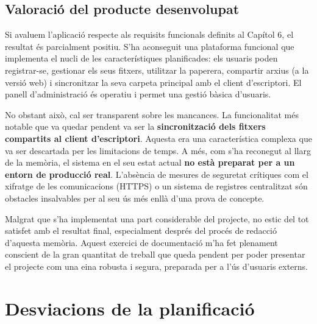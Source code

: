 \subsection{Valoració del producte desenvolupat}

Si avaluem l'aplicació respecte als requisits funcionals definits al Capítol 6, el resultat és parcialment positiu. S'ha aconseguit una plataforma funcional que implementa el nucli de les característiques planificades: els usuaris poden registrar-se, gestionar els seus fitxers, utilitzar la paperera, compartir arxius (a la versió web) i sincronitzar la seva carpeta principal amb el client d'escriptori. El panell d'administració és operatiu i permet una gestió bàsica d'usuaris.

No obstant això, cal ser transparent sobre les mancances. La funcionalitat més notable que va quedar pendent va ser la \textbf{sincronització dels fitxers compartits al client d'escriptori}. Aquesta era una característica complexa que va ser descartada per les limitacions de temps. A més, com s'ha reconegut al llarg de la memòria, el sistema en el seu estat actual \textbf{no està preparat per a un entorn de producció real}. L'absència de mesures de seguretat crítiques com el xifratge de les comunicacions (HTTPS) o un sistema de registres centralitzat són obstacles insalvables per al seu ús més enllà d'una prova de concepte.

Malgrat que s'ha implementat una part considerable del projecte, no estic del tot satisfet amb el resultat final, especialment després del procés de redacció d'aquesta memòria. Aquest exercici de documentació m'ha fet plenament conscient de la gran quantitat de treball que queda pendent per poder presentar el projecte com una eina robusta i segura, preparada per a l'ús d'usuaris externs.

\section{Desviacions de la planificació}

